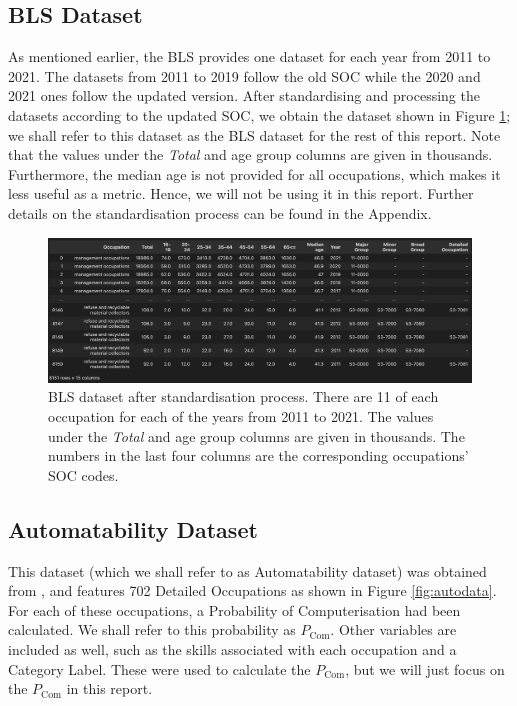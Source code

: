 \documentclass[11pt]{article}
\begin{document}
\subsection{BLS Dataset}
\label{subsec: BLS}
As mentioned earlier, the BLS provides one dataset for each year from 2011 to 2021. The datasets from 2011 to 2019 follow the old SOC while the 2020 and 2021 ones follow the updated version. After standardising and processing the datasets according to the updated SOC, we obtain the dataset shown in Figure \ref{fig:df}; we shall refer to this dataset as the BLS dataset for the rest of this report. Note that the values under the \emph{Total} and age group columns are given in thousands. Furthermore, the median age is not provided for all occupations, which makes it less useful as a metric. Hence, we will not be using it in this report. Further details on the standardisation process can be found in the Appendix.

\begin{figure}[!htb]
    \centering
    \includegraphics[width=15cm]{Figures/joint_processed.png}
    \caption{BLS dataset after standardisation process. There are 11 of each occupation for each of the years from 2011 to 2021. The values under the \emph{Total} and age group columns are given in thousands. The numbers in the last four columns are the corresponding occupations' SOC codes.}
	\label{fig:df}
\end{figure}



\subsection{Automatability Dataset}
\label{subsec:Automatability Dataset}

This dataset (which we shall refer to as Automatability dataset) was obtained from \cite{osborne2017future}, and features 702 Detailed Occupations as shown in Figure \ref{fig:autodata}. For each of these occupations, a Probability of Computerisation had been calculated. We shall refer to this probability as $P_{\text{Com}}$. Other variables are included as well, such as the skills associated with each occupation and a Category Label. These were used to calculate the $P_{\text{Com}}$, but we will just focus on the $P_{\text{Com}}$ in this report.
\end{document}
